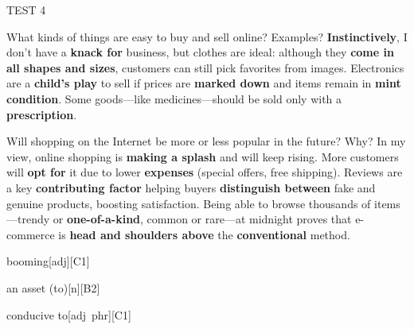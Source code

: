 \begin{glossarymc}[Cambridge 4]
\begin{test}{TEST 4}
	\begin{qa}{What kinds of things are easy to buy and sell online? Examples?}
	\textbf{Instinctively}, I don’t have a \textbf{knack for} business, but clothes are ideal: although they \textbf{come in all shapes and sizes}, customers can still pick favorites from images. Electronics are a \textbf{child’s play} to sell if prices are \textbf{marked down} and items remain in \textbf{mint condition}. Some goods—like medicines—should be sold only with a \textbf{prescription}.
	\end{qa}

	\begin{qa}{Will shopping on the Internet be more or less popular in the future? Why?}
	In my view, online shopping is \textbf{making a splash} and will keep rising. More customers will \textbf{opt for} it due to lower \textbf{expenses} (special offers, free shipping). Reviews are a key \textbf{contributing factor} helping buyers \textbf{distinguish between} fake and genuine products, boosting satisfaction. Being able to browse thousands of items—trendy or \textbf{one-of-a-kind}, common or rare—at midnight proves that e-commerce is \textbf{head and shoulders above} the \textbf{conventional} method.
	\end{qa}

        \begin{VocabExplain}[Part 3]
			\begin{ExplainCard}{booming}[adj][C1]
			\end{ExplainCard}

			\begin{ExplainCard}{an asset (to)}[n][B2]
			\end{ExplainCard}

			\begin{ExplainCard}{conducive to}[adj~phr][C1]
			\end{ExplainCard}


\end{VocabExplain}
\end{test}
\end{glossarymc}
